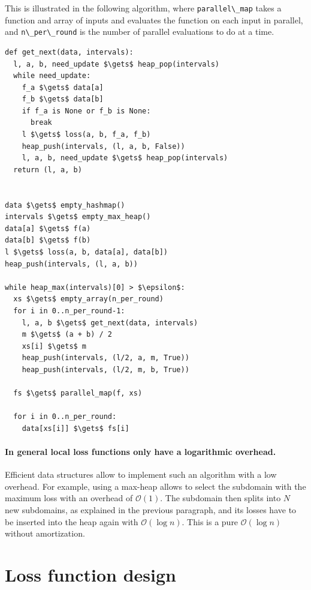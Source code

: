 This is illustrated in the following algorithm, where \passthrough{\lstinline!parallel\_map!} takes a function and array of inputs and evaluates the function on each input in parallel, and \passthrough{\lstinline!n\_per\_round!} is the number of parallel evaluations to do at a time.

\begin{lstlisting}
def get_next(data, intervals):
  l, a, b, need_update $\gets$ heap_pop(intervals)
  while need_update:
    f_a $\gets$ data[a]
    f_b $\gets$ data[b]
    if f_a is None or f_b is None:
      break
    l $\gets$ loss(a, b, f_a, f_b)
    heap_push(intervals, (l, a, b, False))
    l, a, b, need_update $\gets$ heap_pop(intervals)
  return (l, a, b)


data $\gets$ empty_hashmap()
intervals $\gets$ empty_max_heap()
data[a] $\gets$ f(a)
data[b] $\gets$ f(b)
l $\gets$ loss(a, b, data[a], data[b])
heap_push(intervals, (l, a, b))

while heap_max(intervals)[0] > $\epsilon$:
  xs $\gets$ empty_array(n_per_round)
  for i in 0..n_per_round-1:
    l, a, b $\gets$ get_next(data, intervals)
    m $\gets$ (a + b) / 2
    xs[i] $\gets$ m
    heap_push(intervals, (l/2, a, m, True))
    heap_push(intervals, (l/2, m, b, True))

  fs $\gets$ parallel_map(f, xs)

  for i in 0..n_per_round:
    data[xs[i]] $\gets$ fs[i]
\end{lstlisting}

\hypertarget{in-general-local-loss-functions-only-have-a-logarithmic-overhead.}{%
\paragraph{In general local loss functions only have a logarithmic overhead.}\label{in-general-local-loss-functions-only-have-a-logarithmic-overhead.}}

Efficient data structures allow to implement such an algorithm with a low overhead.
For example, using a max-heap allows to select the subdomain with the maximum loss with an overhead of $\mathcal{O}(1)$.
The subdomain then splits into $N$ new subdomains, as explained in the previous paragraph, and its losses have to be inserted into the heap again with $\mathcal{O}(\log{n})$.
This is a pure $\mathcal{O}(\log{n})$ without amortization.

\hypertarget{loss-function-design}{%
\section{Loss function design}\label{loss-function-design}}

